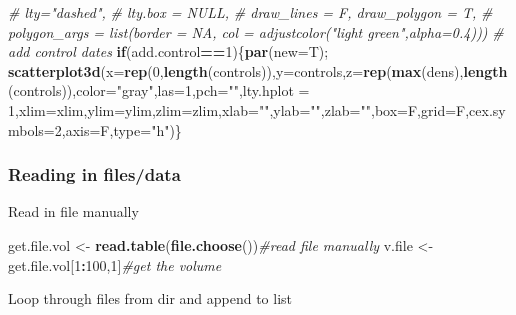 \documentclass[10,portrait]{article}
\newenvironment{Shaded}{\begin{snugshade}}{\end{snugshade}}
\newcommand{\KeywordTok}[1]{\textcolor[rgb]{0.13,0.29,0.53}{\textbf{#1}}}
\newcommand{\DataTypeTok}[1]{\textcolor[rgb]{0.13,0.29,0.53}{#1}}
\newcommand{\DecValTok}[1]{\textcolor[rgb]{0.00,0.00,0.81}{#1}}
\newcommand{\StringTok}[1]{\textcolor[rgb]{0.31,0.60,0.02}{#1}}
\newcommand{\CommentTok}[1]{\textcolor[rgb]{0.56,0.35,0.01}{\textit{#1}}}
\newcommand{\ControlFlowTok}[1]{\textcolor[rgb]{0.13,0.29,0.53}{\textbf{#1}}}
\newcommand{\OperatorTok}[1]{\textcolor[rgb]{0.81,0.36,0.00}{\textbf{#1}}}
\newcommand{\NormalTok}[1]{#1}
\begin{document}
\begin{Shaded}
\begin{Highlighting}[]
\CommentTok{#            lty="dashed",}
\CommentTok{#          lty.box = NULL,}
\CommentTok{#          draw_lines = F, draw_polygon = T,}
\CommentTok{#          polygon_args = list(border = NA, col = adjustcolor("light green",alpha=0.4)))}
\CommentTok{# add control dates}
\ControlFlowTok{if}\NormalTok{(add.control}\OperatorTok{==}\DecValTok{1}\NormalTok{)\{}\KeywordTok{par}\NormalTok{(}\DataTypeTok{new=}\NormalTok{T); }\KeywordTok{scatterplot3d}\NormalTok{(}\DataTypeTok{x=}\KeywordTok{rep}\NormalTok{(}\DecValTok{0}\NormalTok{,}\KeywordTok{length}\NormalTok{(controls)),}\DataTypeTok{y=}\NormalTok{controls,}\DataTypeTok{z=}\KeywordTok{rep}\NormalTok{(}\KeywordTok{max}\NormalTok{(dens),}\KeywordTok{length}\NormalTok{(controls)),}\DataTypeTok{color=}\StringTok{"gray"}\NormalTok{,}\DataTypeTok{las=}\DecValTok{1}\NormalTok{,}\DataTypeTok{pch=}\StringTok{""}\NormalTok{,}\DataTypeTok{lty.hplot =} \DecValTok{1}\NormalTok{,}\DataTypeTok{xlim=}\NormalTok{xlim,}\DataTypeTok{ylim=}\NormalTok{ylim,}\DataTypeTok{zlim=}\NormalTok{zlim,}\DataTypeTok{xlab=}\StringTok{""}\NormalTok{,}\DataTypeTok{ylab=}\StringTok{""}\NormalTok{,}\DataTypeTok{zlab=}\StringTok{""}\NormalTok{,}\DataTypeTok{box=}\NormalTok{F,}\DataTypeTok{grid=}\NormalTok{F,}\DataTypeTok{cex.symbols=}\DecValTok{2}\NormalTok{,}\DataTypeTok{axis=}\NormalTok{F,}\DataTypeTok{type=}\StringTok{"h"}\NormalTok{)\}}
\end{Highlighting}
\end{Shaded}

\subsubsection{Reading in files/data}\label{reading-in-filesdata}

Read in file manually

\begin{Shaded}
\begin{Highlighting}[]
\NormalTok{get.file.vol <-}\StringTok{ }\KeywordTok{read.table}\NormalTok{(}\KeywordTok{file.choose}\NormalTok{())}\CommentTok{#read file manually}
\NormalTok{v.file <-}\StringTok{ }\NormalTok{get.file.vol[}\DecValTok{1}\OperatorTok{:}\DecValTok{100}\NormalTok{,}\DecValTok{1}\NormalTok{]}\CommentTok{#get the volume}
\end{Highlighting}
\end{Shaded}

Loop through files from dir and append to list
\end{document}
